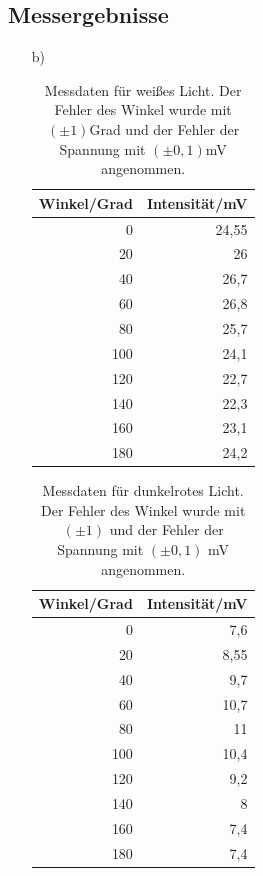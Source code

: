 \documentclass[12pt]{scrartcl}
\begin{document}
\subsection{Messergebnisse}
\begin{enumerate}
\item[b)]

\begin{table}[htbp]
\caption{Messdaten für weißes Licht. Der Fehler des Winkel wurde mit $(\pm 1)$Grad und der Fehler der Spannung mit $(\pm 0,1)$mV angenommen.}
\begin{center}
\begin{tabular}{|r|r|}
\hline
\multicolumn{1}{|l|}{Winkel/Grad} & \multicolumn{1}{l|}{Intensität/mV} \\ \hline
0 & 24,55 \\ \hline
20 & 26 \\ \hline
40 & 26,7 \\ \hline
60 & 26,8 \\ \hline
80 & 25,7 \\ \hline
100 & 24,1 \\ \hline
120 & 22,7 \\ \hline
140 & 22,3 \\ \hline
160 & 23,1 \\ \hline
180 & 24,2 \\ \hline
\end{tabular}
\end{center}
\label{tab:a_5_b_w}
\end{table}


\begin{table}[htbp]
\caption{Messdaten für dunkelrotes Licht. Der Fehler des Winkel wurde mit $(\pm 1)$ und der Fehler der Spannung mit $(\pm 0,1)$ mV angenommen.}
\begin{center}
\begin{tabular}{|r|r|}
\hline
\multicolumn{1}{|l|}{Winkel/Grad} & \multicolumn{1}{l|}{Intensität/mV} \\ \hline
0 & 7,6 \\ \hline
20 & 8,55 \\ \hline
40 & 9,7 \\ \hline
60 & 10,7 \\ \hline
80 & 11 \\ \hline
100 & 10,4 \\ \hline
120 & 9,2 \\ \hline
140 & 8 \\ \hline
160 & 7,4 \\ \hline
180 & 7,4 \\ \hline
\end{tabular}
\end{center}
\label{tab:a_5_b_dr}
\end{table}


\end{enumerate}
\end{document}
